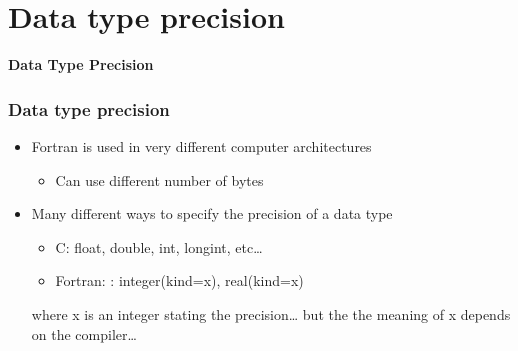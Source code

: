 \section{Data type precision}

\begin{frame}
	\centering
	\Huge \textbf{Data Type Precision}
\end{frame}

\begin{frame}
  \frametitle{Data type precision}
  \begin{itemize}
  \item   Fortran is used in very different computer architectures
  \begin{itemize}
    \item Can use different number of bytes
  \end{itemize}
  \end{itemize}

  \begin{itemize}
  \item   Many different ways to specify the precision of a data type
  \begin{itemize}
    \item C: float, double, int, longint, etc…
    \item Fortran: : integer(kind=x), real(kind=x)
  \end{itemize}
  where x is an integer stating the precision… but the the meaning of x depends on the compiler…
  \end{itemize}
\end{frame}

